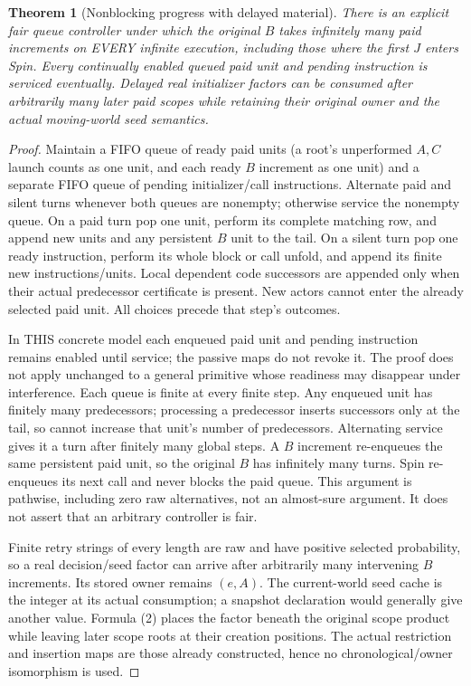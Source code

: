 \documentclass[11pt]{article}\usepackage{amsmath,amssymb,amsthm}
\newtheorem{theorem}{Theorem}\newtheorem{proposition}{Proposition}
\begin{document}
\begin{theorem}[Nonblocking progress with delayed material]
There is an explicit fair queue controller under which the original $B$ takes infinitely many paid increments on EVERY infinite execution, including those where the first $J$ enters Spin. Every continually enabled queued paid unit and pending instruction is serviced eventually. Delayed real initializer factors can be consumed after arbitrarily many later paid scopes while retaining their original owner and the actual moving-world seed semantics.
\end{theorem}
\begin{proof}
Maintain a FIFO queue of ready paid units (a root's unperformed $A,C$ launch counts as one unit, and each ready $B$ increment as one unit) and a separate FIFO queue of pending initializer/call instructions. Alternate paid and silent turns whenever both queues are nonempty; otherwise service the nonempty queue. On a paid turn pop one unit, perform its complete matching row, and append new units and any persistent $B$ unit to the tail. On a silent turn pop one ready instruction, perform its whole block or call unfold, and append its finite new instructions/units. Local dependent code successors are appended only when their actual predecessor certificate is present. New actors cannot enter the already selected paid unit. All choices precede that step's outcomes.

In THIS concrete model each enqueued paid unit and pending instruction remains enabled until service; the passive maps do not revoke it. The proof does not apply unchanged to a general primitive whose readiness may disappear under interference. Each queue is finite at every finite step. Any enqueued unit has finitely many predecessors; processing a predecessor inserts successors only at the tail, so cannot increase that unit's number of predecessors. Alternating service gives it a turn after finitely many global steps. A $B$ increment re-enqueues the same persistent paid unit, so the original $B$ has infinitely many turns. Spin re-enqueues its next call and never blocks the paid queue. This argument is pathwise, including zero raw alternatives, not an almost-sure argument. It does not assert that an arbitrary controller is fair.

Finite retry strings of every length are raw and have positive selected probability, so a real decision/seed factor can arrive after arbitrarily many intervening $B$ increments. Its stored owner remains $(e,A)$. The current-world seed cache is the integer at its actual consumption; a snapshot declaration would generally give another value. Formula (2) places the factor beneath the original scope product while leaving later scope roots at their creation positions. The actual restriction and insertion maps are those already constructed, hence no chronological/owner isomorphism is used.\end{proof}
\end{document}
